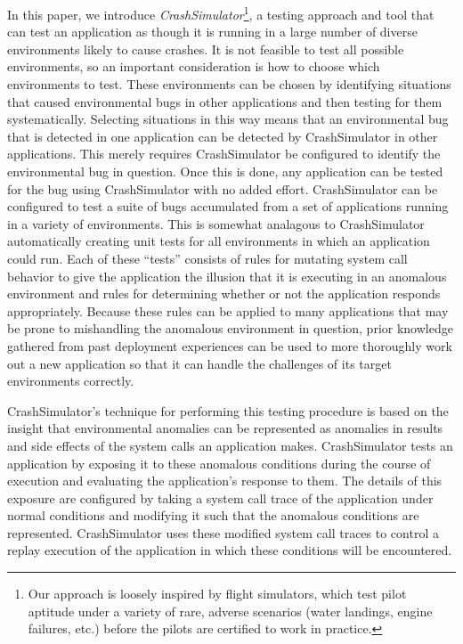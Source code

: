 In this paper, we introduce {\em CrashSimulator}\footnote{ Our approach is
loosely inspired by flight simulators, which test pilot aptitude under a
variety of rare, adverse scenarios (water landings, engine failures, etc.)
before the pilots are certified to work in practice.}, a testing approach
and tool that can test an application as though it is running in a large
number of diverse environments likely to cause crashes.  It is not feasible
to test all possible environments, so an important consideration is how to
choose which environments to test.  These environments can be chosen by
identifying situations that caused environmental bugs in other applications
and then testing for them systematically.  Selecting situations in this way
means that an environmental bug that is detected in one application can be
detected by CrashSimulator in other applications.  This merely requires
CrashSimulator be configured to identify the environmental bug in question.
Once this is done, any application can be tested for the bug using
CrashSimulator with no added effort.  CrashSimulator can be configured to
test a suite of bugs accumulated from a set of applications running in a
variety of environments.  This is somewhat analagous to CrashSimulator
automatically creating unit tests for all environments in which an
application could run.  Each of these ``tests'' consists of rules for
mutating system call behavior to give the application the illusion that it
is executing in an anomalous environment and rules for determining whether
or not the application responds appropriately.  Because these rules can be
applied to many applications that may be prone to mishandling the anomalous
environment in question, prior knowledge gathered from past deployment
experiences can be used to more thoroughly work out a new application so
that it can handle the challenges of its target environments correctly.

CrashSimulator's technique for performing this testing procedure is based
on the insight that environmental anomalies can be represented as anomalies
in results and side effects of the system calls an application makes.
CrashSimulator tests an application by exposing it to these anomalous
conditions during the course of execution and evaluating the application's
response to them.  The details of this exposure are configured by taking a
system call trace of the application under normal conditions and modifying
it such that the anomalous conditions are represented.  CrashSimulator uses
these modified system call traces to control a replay execution of the
application in which these conditions will be encountered.


